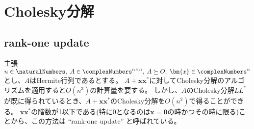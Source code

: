 \chapter{Cholesky分解}
    \section{rank-one update}
        \begin{itembox}[l]{主張}
            $n\in\naturalNumbers,\;A\in\complexNumbers^{n\times n},\;A\succeq O,\;\bm{x}\in\complexNumbers^n$とし、$A$はHermite行列であるとする。
            $A+\bm{x}\bm{x}^*$に対してCholesky分解のアルゴリズムを適用すると$O(n^3)$の計算量を要する。
            しかし、$A$のCholesky分解$LL^*$が既に得られているとき、$A+\bm{x}\bm{x}^*$のCholesky分解を$O(n^2)$で得ることができる。
            $\bm{x}\bm{x}^*$の階数が1以下である(特に0となるのは$\bm{x}=\bm{0}$の時かつその時に限る)ことから、この方法は ``rank-one update'' と呼ばれている。
        \end{itembox}
